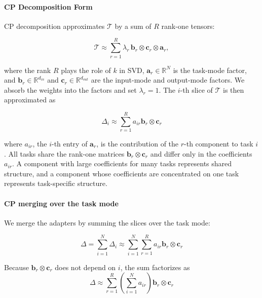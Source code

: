 \documentclass[10pt]{article} %
\begin{document}
    \paragraph{CP Decomposition Form}

    CP decomposition approximates $\mathcal{T}$ by a sum of $R$ rank-one tensors:

    \begin{equation}
        \label{eq:cp_decomposition}\mathcal{T}\approx \sum_{r=1}^{R}\lambda_r\,\mathbf{b}_{r}
        \otimes \mathbf{c}_{r}\otimes \mathbf{a}_{r},
    \end{equation}

    where the rank $R$ plays the role of $k$ in SVD, $\mathbf{a}_{r}
    \in \mathbb{R}^{N}$ is the task-mode factor, and
    $\mathbf{b}_{r}\in \mathbb{R}^{d_{in}}$ and
    $\mathbf{c}_{r}\in \mathbb{R}^{d_{out}}$ are the input-mode and output-mode
    factors. We absorb the weights into the factors and set $\lambda_r=1$. The
    $i$-th slice of $\mathcal{T}$ is then approximated as

    \begin{equation}
        \label{eq:cp_form}
        \Delta_{i}\approx \sum_{r=1}^{R}a_{ir}\mathbf{b}_{r}\otimes
        \mathbf{c}_{r}
    \end{equation}

    where $a_{ir}$, the $i$-th entry of $\mathbf{a}_{r}$, is the contribution of
    the $r$-th component to task $i$. All tasks share the rank-one matrices
    $\mathbf{b}_{r}\otimes\mathbf{c}_{r}$ and differ only in the coefficients
    $a_{ir}$. A component with large coefficients for many tasks represents
    shared structure, and a component whose coefficients are concentrated on one
    task represents task-specific structure.

    \paragraph{CP merging over the task mode}

    We merge the adapters by summing the slices over the task mode:

    \begin{equation}
        \Delta = \sum_{i=1}^{N}\Delta_{i}\approx \sum_{i=1}^{N}\sum_{r=1}^{R}a_{ir}
        \mathbf{b}_{r}\otimes \mathbf{c}_{r}
    \end{equation}

    Because $\mathbf{b}_{r}\otimes \mathbf{c}_{r}$ does not depend on $i$, the
    sum factorizes as
    \begin{equation}
        \label{eq:cp_merge}\Delta \approx \sum_{r=1}^{R}\left( \sum_{i=1}^{N}a_{ir}
        \right) \mathbf{b}_{r}\otimes \mathbf{c}_{r}
    \end{equation}
\end{document}
